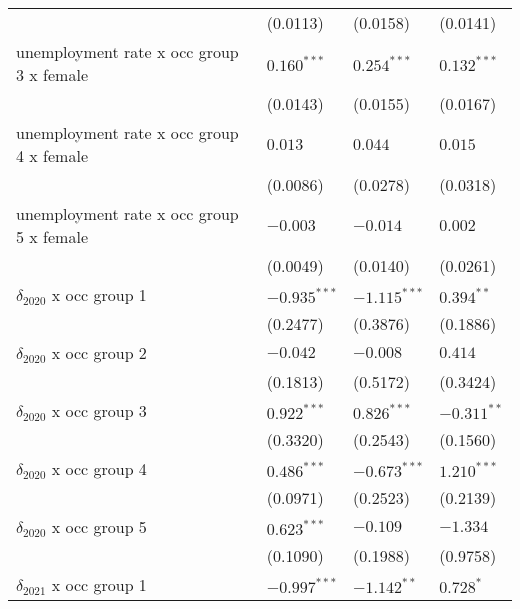 \begin{tabular}{llll}
                                         &           (0.0113) &           (0.0158) &           (0.0141) \\
unemployment rate x occ group 3 x female &      $0.160^{***}$ &      $0.254^{***}$ &      $0.132^{***}$ \\
                                         &           (0.0143) &           (0.0155) &           (0.0167) \\
unemployment rate x occ group 4 x female &            $0.013$ &            $0.044$ &            $0.015$ \\
                                         &           (0.0086) &           (0.0278) &           (0.0318) \\
unemployment rate x occ group 5 x female &           $-0.003$ &           $-0.014$ &            $0.002$ \\
                                         &           (0.0049) &           (0.0140) &           (0.0261) \\
$\delta_{2020}$ x occ group 1            &     $-0.935^{***}$ &     $-1.115^{***}$ &       $0.394^{**}$ \\
                                         &           (0.2477) &           (0.3876) &           (0.1886) \\
$\delta_{2020}$ x occ group 2            &           $-0.042$ &           $-0.008$ &            $0.414$ \\
                                         &           (0.1813) &           (0.5172) &           (0.3424) \\
$\delta_{2020}$ x occ group 3            &      $0.922^{***}$ &      $0.826^{***}$ &      $-0.311^{**}$ \\
                                         &           (0.3320) &           (0.2543) &           (0.1560) \\
$\delta_{2020}$ x occ group 4            &      $0.486^{***}$ &     $-0.673^{***}$ &      $1.210^{***}$ \\
                                         &           (0.0971) &           (0.2523) &           (0.2139) \\
$\delta_{2020}$ x occ group 5            &      $0.623^{***}$ &           $-0.109$ &           $-1.334$ \\
                                         &           (0.1090) &           (0.1988) &           (0.9758) \\
$\delta_{2021}$ x occ group 1            &     $-0.997^{***}$ &      $-1.142^{**}$ &          $0.728^*$ \\

\end{tabular}
